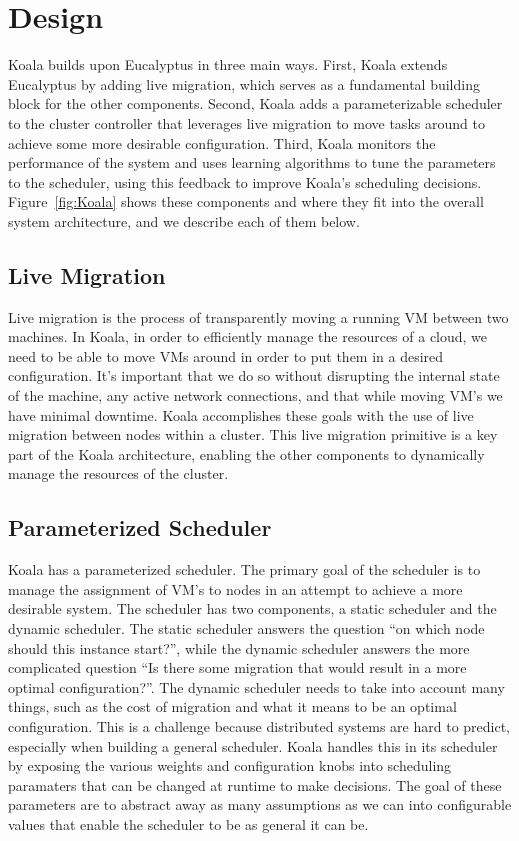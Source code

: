 \section{Design}

Koala builds upon Eucalyptus in three main ways.  First, Koala extends
Eucalyptus by adding live migration, which serves as a fundamental building
block for the other components.  Second, Koala adds a parameterizable scheduler
to the cluster controller that leverages live migration to move tasks around to
achieve some more desirable configuration.  Third, Koala monitors the
performance of the system and uses learning algorithms to tune the parameters
to the scheduler, using this feedback to improve Koala's scheduling decisions.
Figure~\ref{fig:Koala} shows these components and where they fit into the
overall system architecture, and we describe each of them below.


\subsection{Live Migration}
Live migration is the process of transparently moving a running VM between two machines.  In Koala, in order to efficiently manage the resources of a cloud, we need to be able to move VMs around in order to put them in a desired configuration.  It's important that we do so without disrupting the internal state of the machine, any active network connections, and that while moving VM's we have minimal downtime.  Koala accomplishes these goals with the use of live migration between nodes within a cluster.  This live migration primitive is a key part of the Koala architecture, enabling the other components to dynamically manage the resources of the cluster.

\subsection{Parameterized Scheduler}
Koala has a parameterized scheduler.  The primary goal of the scheduler is to manage the assignment of VM's to nodes in an attempt to achieve a more desirable system.  The scheduler has two components, a static scheduler and the dynamic scheduler.  The static scheduler answers the question ``on which node should this instance start?'', while the dynamic scheduler answers the more complicated question ``Is there some migration that would result in a more optimal configuration?''.  The dynamic scheduler needs to take into account many things, such as the cost of migration and what it means to be an optimal configuration.  This is a challenge because distributed systems are hard to predict, especially when building a general scheduler.  Koala handles this in its scheduler by exposing the various weights and configuration knobs into scheduling paramaters that can be changed at runtime to make decisions.  The goal of these parameters are to abstract away as many assumptions as we can into configurable values that enable the scheduler to be as general it can be.

